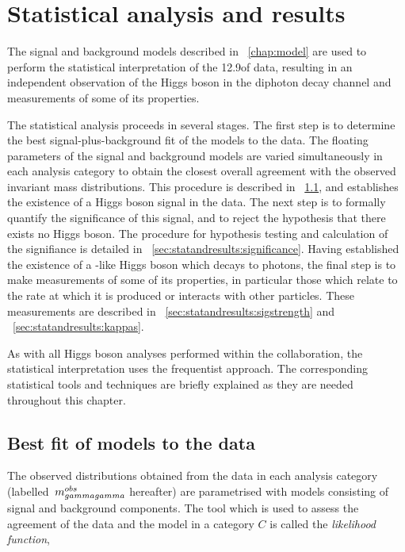 \chapter{Statistical analysis and results}
\label{chap:statandresults}

The signal and background models described in \Chapter~\ref{chap:model} are used to perform the statistical interpretation of the 12.9\ifb of data, resulting in an independent observation of the Higgs boson in the diphoton decay channel and measurements of some of its properties. %

The statistical analysis proceeds in several stages. The first step is to determine the best signal-plus-background fit of the models to the data. The floating parameters of the signal and background models are varied simultaneously in each analysis category to obtain the closest overall agreement with the observed invariant mass distributions. This procedure is described in \Sec~\ref{sec:statandresults:bestfit}, and establishes the existence of a Higgs boson signal in the data. The next step is to formally quantify the significance of this signal, and to reject the hypothesis that there exists no Higgs boson. The procedure for hypothesis testing and calculation of the signifiance is detailed in \Sec~\ref{sec:statandresults:significance}. Having established the existence of a \SM-like Higgs boson which decays to photons, the final step is to make measurements of some of its properties, in particular those which relate to the rate at which it is produced or interacts with other \SM particles. These measurements are described in \Sec~\ref{sec:statandresults:sigstrength} and \Sec~\ref{sec:statandresults:kappas}. 
 
As with all Higgs boson analyses performed within the \CMS collaboration, the statistical interpretation uses the frequentist approach. The corresponding statistical tools and techniques are briefly explained as they are needed throughout this chapter.

\section{Best fit of models to the data}
\label{sec:statandresults:bestfit}

The observed \mgg distributions obtained from the data in each analysis category (labelled $ \,m_{gammagamma}^{obs}$ hereafter) are parametrised with models consisting of signal and background components. The tool which is used to assess the agreement of the data and the model in a category $C$ is called the \emph{likelihood function},

